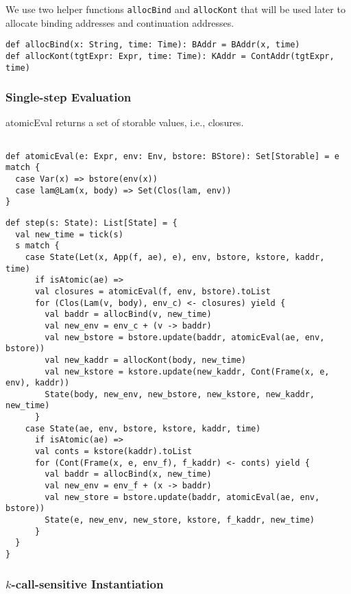 \documentclass[acmsmall,review,anonymous]{acmart}\settopmatter{printfolios=true,printccs=false,printacmref=false}
\begin{document}
We use two helper functions \texttt{allocBind} and \texttt{allocKont} that will be used later
to allocate binding addresses and continuation addresses.

\begin{verbatim}
def allocBind(x: String, time: Time): BAddr = BAddr(x, time)
def allocKont(tgtExpr: Expr, time: Time): KAddr = ContAddr(tgtExpr, time)
\end{verbatim}

\subsubsection{Single-step Evaluation}

atomicEval returns a set of storable values, i.e., closures.

\begin{verbatim}

def atomicEval(e: Expr, env: Env, bstore: BStore): Set[Storable] = e match {
  case Var(x) => bstore(env(x))
  case lam@Lam(x, body) => Set(Clos(lam, env))
}
\end{verbatim}

\begin{verbatim}
def step(s: State): List[State] = {
  val new_time = tick(s)
  s match {
    case State(Let(x, App(f, ae), e), env, bstore, kstore, kaddr, time) 
      if isAtomic(ae) =>
      val closures = atomicEval(f, env, bstore).toList
      for (Clos(Lam(v, body), env_c) <- closures) yield {
        val baddr = allocBind(v, new_time)
        val new_env = env_c + (v -> baddr)
        val new_bstore = bstore.update(baddr, atomicEval(ae, env, bstore))
        val new_kaddr = allocKont(body, new_time)
        val new_kstore = kstore.update(new_kaddr, Cont(Frame(x, e, env), kaddr))
        State(body, new_env, new_bstore, new_kstore, new_kaddr, new_time)
      }
    case State(ae, env, bstore, kstore, kaddr, time) 
      if isAtomic(ae) =>
      val conts = kstore(kaddr).toList
      for (Cont(Frame(x, e, env_f), f_kaddr) <- conts) yield {
        val baddr = allocBind(x, new_time)
        val new_env = env_f + (x -> baddr)
        val new_store = bstore.update(baddr, atomicEval(ae, env, bstore))
        State(e, new_env, new_store, kstore, f_kaddr, new_time)
      }
  }
}
\end{verbatim}

\subsubsection{$k$-call-sensitive Instantiation} \label{kcfainst}
\end{document}
